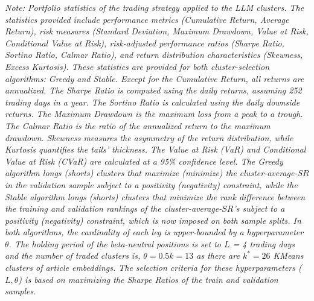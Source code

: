 \begin{landscape}
\begin{table}[H]
\begin{minipage}{\textwidth}
\small\textit{Note: 
Portfolio statistics of the trading strategy applied to the LLM clusters.
The statistics provided include performance metrics (Cumulative Return, Average Return), risk measures (Standard Deviation, Maximum Drawdown, Value at Risk, Conditional Value at Risk), risk-adjusted performance ratios (Sharpe Ratio, Sortino Ratio, Calmar Ratio), and return distribution characteristics (Skewness, Excess Kurtosis). These statistics are provided for both cluster-selection algorithms: Greedy and Stable. 
Except for the Cumulative Return, all returns are annualized. The Sharpe Ratio is computed using the daily returns, assuming 252 trading days in a year. The Sortino Ratio is calculated using the daily downside returns. The Maximum Drawdown is the maximum loss from a peak to a trough. The Calmar Ratio is the ratio of the annualized return to the maximum drawdown. Skewness measures the asymmetry of the return distribution, while Kurtosis quantifies the tails' thickness. The Value at Risk (VaR) and Conditional Value at Risk (CVaR) are calculated at a 95\% confidence level.
The Greedy algorithm longs (shorts) clusters that maximize (minimize) the cluster-average-$SR$ in the validation sample subject to a positivity (negativity) constraint, while the Stable algorithm longs (shorts) clusters that minimize the rank difference between the training and validation rankings of the cluster-average-$SR$'s subject to a positivity (negativity) constraint, which is now imposed on both sample splits. In both algorithms, the cardinality of each leg is upper-bounded by a hyperparameter $\theta$. 
The holding period of the beta-neutral positions is set to $L$ = 4 trading days and the number of traded clusters is, $\theta = 0.5k=13$ as there are $k^*=26$ KMeans clusters of article embeddings. The selection criteria for these hyperparameters ($L,\theta$) is based on maximizing the Sharpe Ratios of the train and validation samples.
}
\end{minipage}
\end{table}
\end{landscape}
